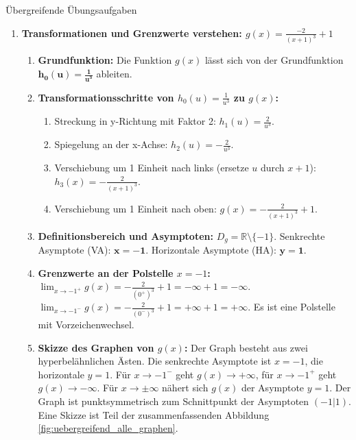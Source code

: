 \begin{loesungsumgebung}{Übergreifende Übungsaufgaben}
\begin{enumerate}
    \item \textbf{Transformationen und Grenzwerte verstehen: $g(x) = \frac{-2}{(x+1)^3} + 1$}
    \begin{enumerate}[label=(\alph*)]
        \item \textbf{Grundfunktion:} Die Funktion $g(x)$ lässt sich von der Grundfunktion $\mathbf{h_0(u) = \frac{1}{u^3}}$ ableiten.
        \item \textbf{Transformationsschritte von $h_0(u)=\frac{1}{u^3}$ zu $g(x)$:}
        \begin{enumerate}
            \item Streckung in y-Richtung mit Faktor 2: $h_1(u) = \frac{2}{u^3}$.
            \item Spiegelung an der x-Achse: $h_2(u) = -\frac{2}{u^3}$.
            \item Verschiebung um 1 Einheit nach links (ersetze $u$ durch $x+1$): $h_3(x) = -\frac{2}{(x+1)^3}$.
            \item Verschiebung um 1 Einheit nach oben: $g(x) = -\frac{2}{(x+1)^3} + 1$.
        \end{enumerate}
        \item \textbf{Definitionsbereich und Asymptoten:}
        $D_g = \mathbb{R} \setminus \{-1\}$. Senkrechte Asymptote (VA): $\mathbf{x=-1}$. Horizontale Asymptote (HA): $\mathbf{y=1}$.
        \item \textbf{Grenzwerte an der Polstelle $x=-1$:}
        $\lim_{x \to -1^+} g(x) = -\frac{2}{(0^+)^3} + 1 = -\infty + 1 = \mathbf{-\infty}$.
        $\lim_{x \to -1^-} g(x) = -\frac{2}{(0^-)^3} + 1 = +\infty + 1 = \mathbf{+\infty}$.
        Es ist eine Polstelle mit Vorzeichenwechsel.
        \item \textbf{Skizze des Graphen von $g(x)$:}
        Der Graph besteht aus zwei hyperbelähnlichen Ästen. Die senkrechte Asymptote ist $x=-1$, die horizontale $y=1$. Für $x \to -1^-$ geht $g(x) \to +\infty$, für $x \to -1^+$ geht $g(x) \to -\infty$. Für $x \to \pm\infty$ nähert sich $g(x)$ der Asymptote $y=1$. Der Graph ist punktsymmetrisch zum Schnittpunkt der Asymptoten $(-1|1)$. Eine Skizze ist Teil der zusammenfassenden Abbildung \ref{fig:uebergreifend_alle_graphen}.
    \end{enumerate}


\end{enumerate}
\end{loesungsumgebung}
